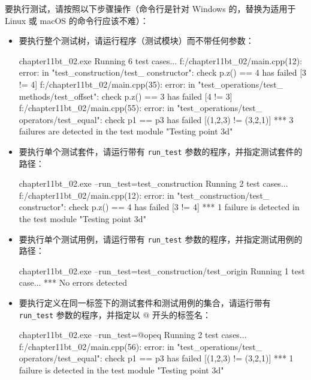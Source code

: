 要执行测试，请按照以下步骤操作（命令行是针对 Windows 的，替换为适用于 Linux 或 macOS 的命令行应该不难）：

\begin{itemize}
\item
要执行整个测试树，请运行程序（测试模块）而不带任何参数：

\begin{shell}
chapter11bt_02.exe
Running 6 test cases...
f:/chapter11bt_02/main.cpp(12): error: in "test_construction/test_
constructor": check p.z() == 4 has failed [3 != 4]
f:/chapter11bt_02/main.cpp(35): error: in "test_operations/test_
methods/test_offset": check p.z() == 3 has failed [4 != 3]
f:/chapter11bt_02/main.cpp(55): error: in "test_operations/test_
operators/test_equal": check p1 == p3 has failed [(1,2,3) !=
(3,2,1)]
*** 3 failures are detected in the test module "Testing point 3d"
\end{shell}

\item
要执行单个测试套件，请运行带有 \verb|run_test| 参数的程序，并指定测试套件的路径：

\begin{shell}
chapter11bt_02.exe --run_test=test_construction
Running 2 test cases...
f:/chapter11bt_02/main.cpp(12): error: in "test_construction/test_
constructor": check p.z() == 4 has failed [3 != 4]
*** 1 failure is detected in the test module "Testing point 3d"
\end{shell}

\item
要执行单个测试用例，请运行带有 \verb|run_test| 参数的程序，并指定测试用例的路径：

\begin{cpp}
chapter11bt_02.exe --run_test=test_construction/test_origin
Running 1 test case...
*** No errors detected
\end{cpp}

\item
要执行定义在同一标签下的测试套件和测试用例的集合，请运行带有 \verb|run_test| 参数的程序，并指定以 @ 开头的标签名：

\begin{cpp}
chapter11bt_02.exe --run_test=@opeq
Running 2 test cases...
f:/chapter11bt_02/main.cpp(56): error: in "test_operations/test_
operators/test_equal": check p1 == p3 has failed [(1,2,3) !=
(3,2,1)]
*** 1 failure is detected in the test module "Testing point 3d"
\end{cpp}
\end{itemize}

